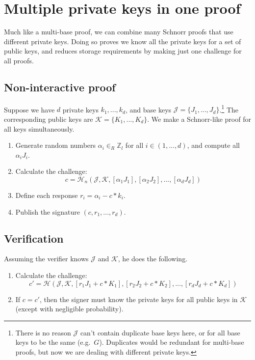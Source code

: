 \section{Multiple private keys in one proof}
\label{sec:multiple_private_keys_in_one_proof}

Much like a multi-base proof, we can combine many Schnorr proofs that use different private keys. Doing so proves we know all the private keys for a set of public keys, and reduces storage requirements by making just one challenge for all proofs.


\subsection*{Non-interactive proof}

Suppose we have $d$ private keys $k_1,...,k_d$, and base keys $\mathcal{J} = \{J_1,...,J_d\}$.\footnote{There is no reason $\mathcal{J}$ can't contain duplicate base keys here, or for all base keys to be the same (e.g.\ $G$). Duplicates would be redundant for multi-base proofs, but now we are dealing with different private keys.} The corresponding public keys are $\mathcal{K} = \{K_1,...,K_d\}$. We make a Schnorr-like proof for all keys simultaneously.

\begin{enumerate}
	\item Generate random numbers $\alpha_i \in_R \mathbb{Z}_l$ for all $i \in (1,...,d)$, and compute all $\alpha_i J_i$.
	\item Calculate the challenge:\vspace{.155cm}
	\[c = \mathcal{H}_n(\mathcal{J},\mathcal{K},[\alpha_1 J_1],[\alpha_2 J_2],...,[\alpha_d J_d])\]
	\item Define each response $r_i = \alpha_i - c*k_i$.
	\item Publish the signature $(c, r_1,...,r_d)$.
\end{enumerate}


\subsection*{Verification}

Assuming the verifier knows $\mathcal{J}$ and $\mathcal{K}$, he does the following.

\begin{enumerate}
	\item Calculate the challenge:\vspace{.175cm}
	\[c' = \mathcal{H}(\mathcal{J},\mathcal{K},[r_1 J_1 + c*K_1],[r_2 J_2 + c*K_2],...,[r_d J_d + c*K_d])\]
	\item If $c = c'$, then the signer must know the private keys for all public keys in $\mathcal{K}$ (except with negligible probability).
\end{enumerate}



